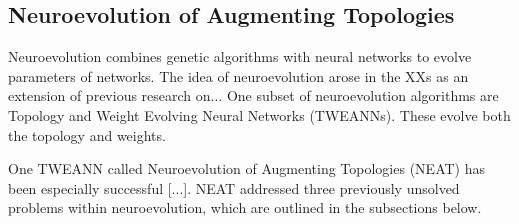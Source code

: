 \subsection{Neuroevolution of Augmenting Topologies}

Neuroevolution combines genetic algorithms with neural networks to evolve parameters of networks. The idea of 
neuroevolution arose in the XXs as an extension of previous research on...
One subset of neuroevolution algorithms are Topology and Weight Evolving Neural Networks (TWEANNs). These
evolve both the topology and weights.

One TWEANN called Neuroevolution of Augmenting Topologies (NEAT) has been especially successful [...].
NEAT addressed three previously unsolved problems within neuroevolution, which are outlined in the subsections below.

